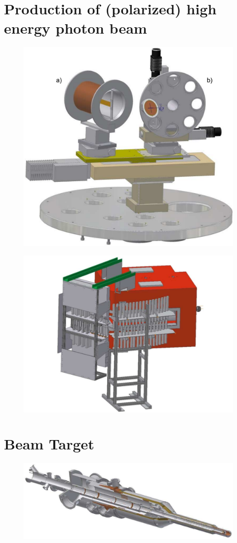 \section{Production of (polarized) high energy photon beam}
\begin{figure}[htbp]
	\centering
	\includegraphics[width=.49\linewidth]{figs/goni-ganz.pdf}
	\caption{\cite{cb}}
\end{figure}
\begin{figure}[htbp]
	\centering
	\includegraphics[width=.49\linewidth]{figs/Tagger.pdf}
	\caption{\cite{cb}}
\end{figure}

\section{Beam Target}

\begin{figure}[htbp]
	\centering
	\includegraphics[width=.5\linewidth]{figs/Target.pdf}
	\caption{\cite{cb}}
\end{figure}
